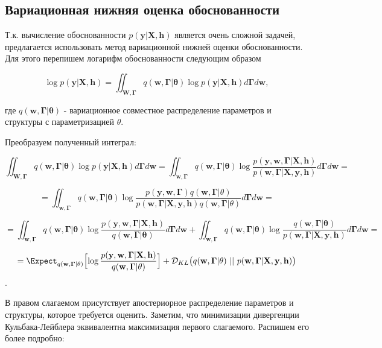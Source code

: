 \documentclass[12pt]{article}
\begin{document}
	\subsection{Вариационная нижняя оценка обоснованности}
	
	Т.к. вычисление обоснованности $p(\mathbf{y}|\mathbf{X, h})$ является очень сложной задачей, предлагается использовать метод вариационной нижней оценки обоснованности. Для этого перепишем логарифм обоснованности следующим образом
	
	$$\log p(\mathbf{y}| \mathbf{X, h}) = \iint_{\mathbf{W, \Gamma}}q(\mathbf{w, \Gamma}| \mathbf{\theta})\log p(\mathbf{y}| \mathbf{X, h})d\mathbf{\Gamma}d\mathbf{w},$$
	
	где $q(\mathbf{w, \Gamma}| \mathbf{\theta})$ - вариационное совместное распределение параметров и структуры с параметризацией $\theta$.
	
	Преобразуем полученный интеграл:
	
	$$\iint_{\mathbf{W, \Gamma}}q(\mathbf{w, \Gamma}| \mathbf{\theta})\log p(\mathbf{y}| \mathbf{X, h})d\mathbf{\Gamma}d\mathbf{w} = \iint_{\mathbf{w, \Gamma}}q(\mathbf{w, \Gamma}| \mathbf{\theta})\log\frac{p(\mathbf{y, w, \Gamma}| \mathbf{X, h})}{p(\mathbf{w, \Gamma}| \mathbf{X, y, h})}d\mathbf{\Gamma}d\mathbf{w} = $$
	
	$$=\iint_{\mathbf{w, \Gamma}}q(\mathbf{w, \Gamma}| \mathbf{\theta})\log\frac{p(\mathbf{y, w, \Gamma})q(\mathbf{w, \Gamma}|\theta)}{p(\mathbf{w, \Gamma}| \mathbf{X, y, h})q(\mathbf{w, \Gamma}|\theta)}d\mathbf{\Gamma}d\mathbf{w}=$$
	
	$$= \iint_{\mathbf{w, \Gamma}}q(\mathbf{w, \Gamma}| \mathbf{\theta})\log\frac{p(\mathbf{y, w, \Gamma}| \mathbf{X, h})}{q(\mathbf{w, \Gamma}| \mathbf{\theta})}d\mathbf{\Gamma}d\mathbf{w} + \iint_{\mathbf{w, \Gamma}}q(\mathbf{w, \Gamma}| \mathbf{\theta})\log\frac{q(\mathbf{w, \Gamma}| \mathbf{\theta})}{p(\mathbf{w, \Gamma}| \mathbf{X, y, h})}d\mathbf{\Gamma}d\mathbf{w}=$$
	
	$$=\Expect_{q(\mathbf{w, \Gamma}| \mathbf{\theta})}\Bigl[\log\frac{p(\mathbf{y, w, \Gamma}| \mathbf{X, h})}{q(\mathbf{w, \Gamma}| \mathbf{\theta})}\Bigr] + \mathcal{D}_{KL}\bigl(q(\mathbf{w, \Gamma}| \mathbf{\theta}) \ ||\  p(\mathbf{w, \Gamma}| \mathbf{X, y, h})\bigr)$$.
	
	В правом слагаемом присутствует апостериорное распределение параметров и структуры, которое требуется оценить. Заметим, что минимизации дивергенции Кульбака-Лейблера эквивалентна максимизация первого слагаемого. Распишем его более подробно:
	
\end{document}
